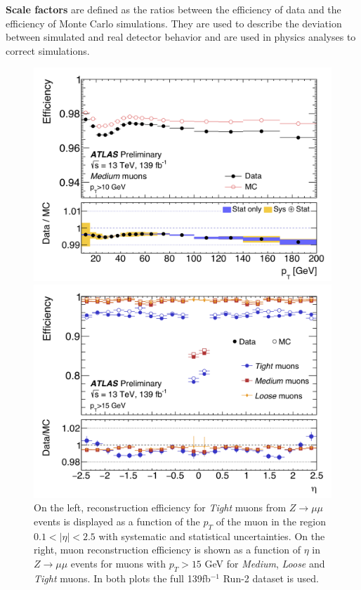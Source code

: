 \textbf{Scale factors} are defined as the ratios between the efficiency of data and the efficiency of Monte Carlo simulations. They are used to describe the deviation between simulated and real detector behavior and are used in physics analyses to correct simulations. 
\begin{figure}[!h]
  \centering
  \begin{minipage}[b]{0.45\textwidth}
    \includegraphics[width=\textwidth]{Pictures/efficiencyoverpt.PNG}
  \end{minipage}
  \hspace{.5cm}
  \begin{minipage}[b]{0.45\textwidth}
    \includegraphics[width=\textwidth]{Pictures/efficiencyovereta.PNG}
  \end{minipage}
  \caption{On the left, reconstruction efficiency for \textit{Tight} muons from $Z \rightarrow \mu\mu$ events is displayed as a function of the $p_T$ of the muon in the region $0.1 < |\eta| < 2.5$ with systematic and statistical uncertainties.  On the right, muon reconstruction efficiency is shown as a function of $\eta$ in $Z \rightarrow \mu\mu$ events for muons with $p_T > 15$ GeV for \textit{Medium}, \textit{Loose} and \textit{Tight} muons. In both plots the full 139fb$^{-1}$ Run-2 dataset is used\cite{MCPPlots}.}
  \label{fig:efficiency}
\end{figure}

